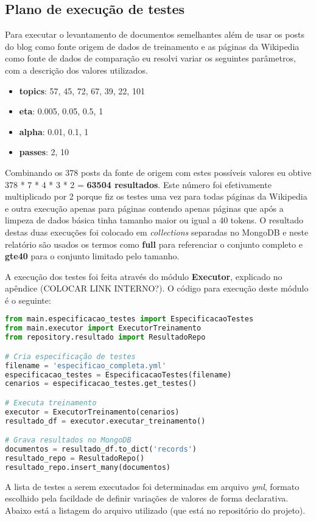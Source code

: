 \subsection{Plano de execução de testes}

Para executar o levantamento de documentos semelhantes além de usar os posts do blog como fonte origem de dados de treinamento e as páginas da 
Wikipedia como fonte de dados de comparação eu resolvi variar os seguintes parâmetros, com a descrição dos valores utilizados.

\begin{itemize}
    \item \textbf{topics}: 57, 45, 72, 67, 39, 22, 101
    \item \textbf{eta}: 0.005, 0.05, 0.5, 1
    \item \textbf{alpha}: 0.01, 0.1, 1
    \item \textbf{passes}: 2, 10
\end{itemize}

Combinando os 378 posts da fonte de origem com estes possíveis valores eu obtive 378 * 7 * 4 * 3 * 2 = \textbf{63504 resultados}. Este número 
foi efetivamente multiplicado por 2 porque fiz os testes uma vez para todas páginas da Wikipedia e outra execução apenas para páginas contendo 
apenas páginas que após a limpeza de dados básica tinha tamanho maior ou igual a 40 tokens. O resultado destas duas execuções foi colocado 
em \textit{collections} separadas no MongoDB e neste relatório são usados os termos como \textbf{full} para referenciar o conjunto completo e 
\textbf{gte40} para o conjunto limitado pelo tamanho.

A execução dos testes foi feita através do módulo \textbf{Executor}, explicado no apêndice (COLOCAR LINK INTERNO?). O código para execução deste 
módulo é o seguinte:

\begin{lstlisting}[language=Python]
from main.especificacao_testes import EspecificacaoTestes
from main.executor import ExecutorTreinamento
from repository.resultado import ResultadoRepo

# Cria especificação de testes
filename = 'especificao_completa.yml'
especificacao_testes = EspecificacaoTestes(filename)
cenarios = especificacao_testes.get_testes()

# Executa treinamento
executor = ExecutorTreinamento(cenarios)
resultado_df = executor.executar_treinamento()

# Grava resultados no MongoDB
documentos = resultado_df.to_dict('records')
resultado_repo = ResultadoRepo()
resultado_repo.insert_many(documentos)
\end{lstlisting}

A lista de testes a serem executados foi determinadas em arquivo \textit{yml}, formato escolhido pela facildade de definir variações de valores
de forma declarativa. Abaixo está a listagem do arquivo utilizado (que está no repositório do projeto).

